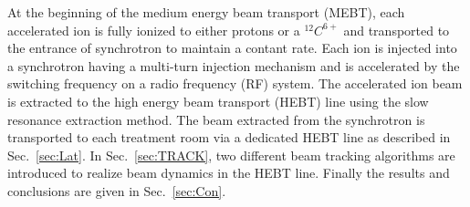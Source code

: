 \documentclass[jkps,preprint,fleqn,showpacs,showkeys]{revtex4}
\begin{document}
At the beginning of the medium energy beam transport (MEBT), each accelerated ion is fully ionized to either protons or a $^{12}C^{6+}$ 
and transported to the entrance of synchrotron to maintain a contant rate. 
Each ion is injected into a synchrotron having a multi-turn injection mechanism and is accelerated by the switching frequency on a radio frequency (RF) system. 
The accelerated ion beam is extracted to the high energy beam transport (HEBT) line using the slow resonance extraction method\cite{Extract,HJYim,Chawon}.
The beam extracted from the synchrotron is transported to each treatment room via a dedicated HEBT line as described in Sec.~\ref{sec:Lat}.
In Sec.~\ref{sec:TRACK}, two different beam tracking algorithms are introduced to realize beam dynamics in the HEBT line.
Finally the results and conclusions are given in Sec.~\ref{sec:Con}.
\end{document}
